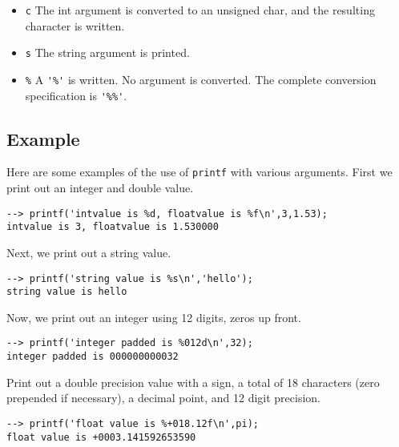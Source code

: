 \begin{itemize}
\item  \verb|c| The int argument is  converted  to  an  unsigned  char, and  the resulting character is written.

\item  \verb|s| The string argument is printed.

\item  \verb|%|   A \verb|'%'| is written. No argument is converted. The complete conversion specification is \verb|'%%'|.

\end{itemize}
\subsection{Example}

Here are some examples of the use of \verb|printf| with various arguments.  First we print out an integer and double value.
\begin{verbatim}
--> printf('intvalue is %d, floatvalue is %f\n',3,1.53);
intvalue is 3, floatvalue is 1.530000
\end{verbatim}
Next, we print out a string value.
\begin{verbatim}
--> printf('string value is %s\n','hello');
string value is hello
\end{verbatim}
Now, we print out an integer using 12 digits, zeros up front.
\begin{verbatim}
--> printf('integer padded is %012d\n',32);
integer padded is 000000000032
\end{verbatim}
Print out a double precision value with a sign, a total of 18 characters (zero prepended if necessary), a decimal point, and 12 digit precision.
\begin{verbatim}
--> printf('float value is %+018.12f\n',pi);
float value is +0003.141592653590
\end{verbatim}

